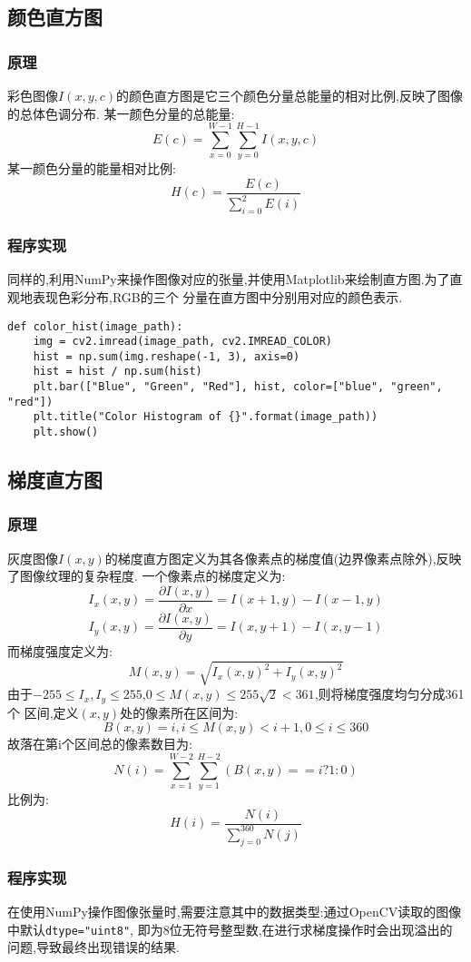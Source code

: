 \documentclass[a4paper]{article}
\begin{document}
        \subsection{颜色直方图}
            \subsubsection{原理}
彩色图像$I(x,y,c)$的颜色直方图是它三个颜色分量总能量的相对比例,反映了图像的总体色调分布.
某一颜色分量的总能量:
$$E(c)=\sum_{x=0}^{W-1}\sum_{y=0}^{H-1}I(x,y,c)$$
某一颜色分量的能量相对比例:
$$H(c)=\frac{E(c)}{\sum_{i=0}^{2}E(i)}$$

            \subsubsection{程序实现}
同样的,利用NumPy来操作图像对应的张量,并使用Matplotlib来绘制直方图.为了直观地表现色彩分布,RGB的三个
分量在直方图中分别用对应的颜色表示.
\begin{verbatim}
def color_hist(image_path):
    img = cv2.imread(image_path, cv2.IMREAD_COLOR)
    hist = np.sum(img.reshape(-1, 3), axis=0)
    hist = hist / np.sum(hist)
    plt.bar(["Blue", "Green", "Red"], hist, color=["blue", "green", "red"])
    plt.title("Color Histogram of {}".format(image_path))
    plt.show()
\end{verbatim}
        \subsection{梯度直方图}
            \subsubsection{原理}
灰度图像$I(x,y)$的梯度直方图定义为其各像素点的梯度值(边界像素点除外),反映了图像纹理的复杂程度.
一个像素点的梯度定义为:
$$I_{x}(x,y)=\frac{\partial I(x,y)}{\partial x}=I(x+1,y)-I(x-1,y)$$
$$I_{y}(x,y)=\frac{\partial I(x,y)}{\partial y}=I(x,y+1)-I(x,y-1)$$
而梯度强度定义为:
$$M(x,y)=\sqrt{I_{x}(x,y)^2+I_{y}(x,y)^2}$$
由于$-255\le I_{x},I_{y} \le 255$,$0 \le M(x,y) \le 255\sqrt{2} < 361$,则将梯度强度均匀分成361个
区间,定义$(x,y)$处的像素所在区间为:
$$B(x,y) = i, i\le M(x,y) < i+1, 0\le i\le 360$$
故落在第i个区间总的像素数目为:
$$N(i) = \sum_{x=1}^{W-2}\sum_{y=1}^{H-2}(B(x,y)==i?1:0)$$
比例为:
$$H(i)=\frac{N(i)}{\sum_{j=0}^{360}N(j)}$$
            \subsubsection{程序实现}
在使用NumPy操作图像张量时,需要注意其中的数据类型:通过OpenCV读取的图像中默认\texttt{dtype="uint8"},
即为8位无符号整型数,在进行求梯度操作时会出现溢出的问题,导致最终出现错误的结果.
\end{document}
